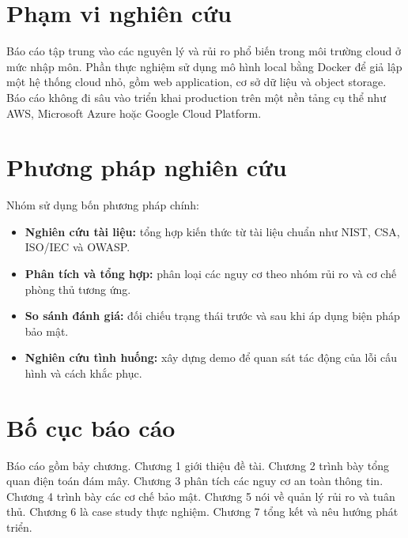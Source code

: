 \section{Phạm vi nghiên cứu}
Báo cáo tập trung vào các nguyên lý và rủi ro phổ biến trong môi trường cloud ở mức nhập môn. Phần thực nghiệm sử dụng mô hình local bằng Docker để giả lập một hệ thống cloud nhỏ, gồm web application, cơ sở dữ liệu và object storage. Báo cáo không đi sâu vào triển khai production trên một nền tảng cụ thể như AWS, Microsoft Azure hoặc Google Cloud Platform.

\section{Phương pháp nghiên cứu}
Nhóm sử dụng bốn phương pháp chính:
\begin{itemize}
    \item \textbf{Nghiên cứu tài liệu:} tổng hợp kiến thức từ tài liệu chuẩn như NIST, CSA, ISO/IEC và OWASP.
    \item \textbf{Phân tích và tổng hợp:} phân loại các nguy cơ theo nhóm rủi ro và cơ chế phòng thủ tương ứng.
    \item \textbf{So sánh đánh giá:} đối chiếu trạng thái trước và sau khi áp dụng biện pháp bảo mật.
    \item \textbf{Nghiên cứu tình huống:} xây dựng demo để quan sát tác động của lỗi cấu hình và cách khắc phục.
\end{itemize}

\section{Bố cục báo cáo}
Báo cáo gồm bảy chương. Chương 1 giới thiệu đề tài. Chương 2 trình bày tổng quan điện toán đám mây. Chương 3 phân tích các nguy cơ an toàn thông tin. Chương 4 trình bày các cơ chế bảo mật. Chương 5 nói về quản lý rủi ro và tuân thủ. Chương 6 là case study thực nghiệm. Chương 7 tổng kết và nêu hướng phát triển.
